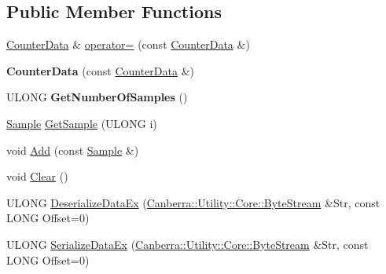 \subsection*{Public Member Functions}
\begin{DoxyCompactItemize}
\item 
\hyperlink{class_canberra_1_1_data_types_1_1_spectroscopy_1_1_counter_data}{Counter\+Data} \& \hyperlink{class_canberra_1_1_data_types_1_1_spectroscopy_1_1_counter_data_a2358c3b34f6886efb11cc0f0a9a9ffeb_a2358c3b34f6886efb11cc0f0a9a9ffeb}{operator=} (const \hyperlink{class_canberra_1_1_data_types_1_1_spectroscopy_1_1_counter_data}{Counter\+Data} \&)
\item 
\mbox{\label{class_canberra_1_1_data_types_1_1_spectroscopy_1_1_counter_data_ad55d36b350c84e42afa508638df3edc3}} 
{\bfseries Counter\+Data} (const \hyperlink{class_canberra_1_1_data_types_1_1_spectroscopy_1_1_counter_data}{Counter\+Data} \&)
\item 
\mbox{\label{class_canberra_1_1_data_types_1_1_spectroscopy_1_1_counter_data_ac0156143038e5dca7014506c2a8fa253}} 
U\+L\+O\+NG {\bfseries Get\+Number\+Of\+Samples} ()
\item 
\hyperlink{class_canberra_1_1_data_types_1_1_spectroscopy_1_1_counter_data_1_1_sample}{Sample} \hyperlink{class_canberra_1_1_data_types_1_1_spectroscopy_1_1_counter_data_a5842b8b3a9fa5a7717d6a8519aafc475_a5842b8b3a9fa5a7717d6a8519aafc475}{Get\+Sample} (U\+L\+O\+NG i)
\item 
void \hyperlink{class_canberra_1_1_data_types_1_1_spectroscopy_1_1_counter_data_a2f684fd84f57e87148a1b057e5bace72_a2f684fd84f57e87148a1b057e5bace72}{Add} (const \hyperlink{class_canberra_1_1_data_types_1_1_spectroscopy_1_1_counter_data_1_1_sample}{Sample} \&)
\item 
void \hyperlink{class_canberra_1_1_data_types_1_1_spectroscopy_1_1_counter_data_a00971d06ce65981fd8f6a37949843b41_a00971d06ce65981fd8f6a37949843b41}{Clear} ()
\item 
U\+L\+O\+NG \hyperlink{class_canberra_1_1_data_types_1_1_spectroscopy_1_1_counter_data_a5a60e038c044f258a42903b16f25feba_a5a60e038c044f258a42903b16f25feba}{Deserialize\+Data\+Ex} (\hyperlink{class_canberra_1_1_utility_1_1_core_1_1_byte_stream}{Canberra\+::\+Utility\+::\+Core\+::\+Byte\+Stream} \&Str, const L\+O\+NG Offset=0)
\item 
U\+L\+O\+NG \hyperlink{class_canberra_1_1_data_types_1_1_spectroscopy_1_1_counter_data_ab1cdfe42b8d4b1fde7af879bc6b92ac1_ab1cdfe42b8d4b1fde7af879bc6b92ac1}{Serialize\+Data\+Ex} (\hyperlink{class_canberra_1_1_utility_1_1_core_1_1_byte_stream}{Canberra\+::\+Utility\+::\+Core\+::\+Byte\+Stream} \&Str, const L\+O\+NG Offset=0)
\end{DoxyCompactItemize}

